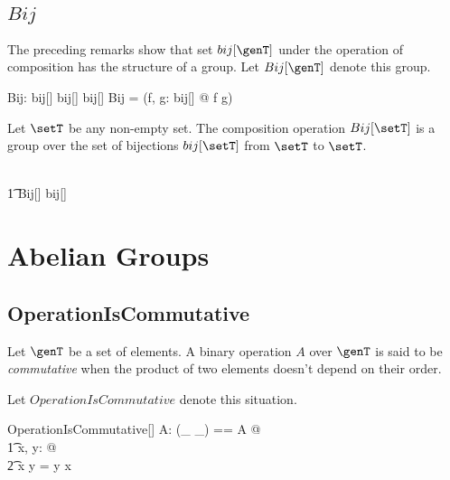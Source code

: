 \documentclass{amsart}
\begin{document}
\subsection{$Bij$}

The preceding remarks show that set $bij[\genT]$ under the operation of composition has the structure of a group.
Let $Bij[\genT]$ denote this group.

\begin{gendef}[\genT]
	Bij: bij[\genT] \cross bij[\genT] \fun bij[\genT]
\where
	Bij = (\lambda f, g: bij[\genT] @ f \circ g)
\end{gendef}

\begin{example}
Let $\setT$ be any non-empty set.
The composition operation $Bij[\setT]$ is a group over the set of bijections $bij[\setT]$ from $\setT$ to $\setT$.

\begin{zed}
\setT \neq \emptyset \implies \\
\t1	Bij[\setT] \in \group bij[\setT]
\end{zed}

\end{example}

\section{Abelian Groups}

\subsection{OperationIsCommutative}

Let $\genT$ be a set of elements.
A binary operation $A$ over $\genT$ is said to be {\em commutative} when the product of two elements doesn't depend on 
their order.

Let $OperationIsCommutative$ denote this situation.

\begin{schema}{OperationIsCommutative}[\genT]
A: \binop \genT
\where
\LET (\_ \mulG \_) == A @ \\
\t1	\forall x, y: \genT @ \\
\t2		x \mulG y = y \mulG x
\end{schema}

\subsection{}
\end{document}

